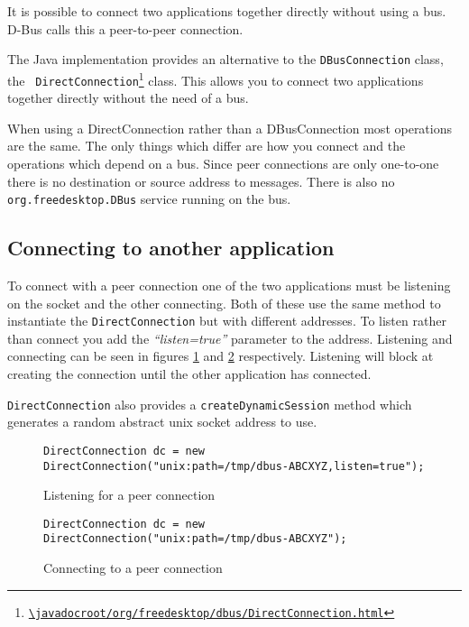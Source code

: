 \documentclass[a4paper,12pt]{article}
\begin{document}
It is possible to connect two applications together directly without using a
bus. D-Bus calls this a peer-to-peer connection.

The Java implementation provides an alternative to the {\tt DBusConnection}
class, the {\tt
DirectConnection\footnote{\url{\javadocroot/org/freedesktop/dbus/DirectConnection.html}}}
class. This allows you to connect two applications together directly without
the need of a bus.

When using a DirectConnection rather than a DBusConnection most operations are
the same. The only things which differ are how you connect and the operations
which depend on a bus. Since peer connections are only one-to-one there is no
destination or source address to messages. There is also no {\tt
org.freedesktop.DBus} service running on the bus.

\subsection{Connecting to another application}

To connect with a peer connection one of the two applications must be listening
on the socket and the other connecting. Both of these use the same method to
instantiate the {\tt DirectConnection} but with different addresses. To listen
rather than connect you add the {\em ``listen=true''} parameter to the address.
Listening and connecting can be seen in figures \ref{fig:p2plisten} and
\ref{fig:p2pconnect} respectively. Listening will block at creating the
connection until the other application has connected.

{\tt DirectConnection} also provides a {\tt createDynamicSession} method which
generates a random abstract unix socket address to use.

\begin{figure}[htb]
\begin{center}
\begin{verbatim}
DirectConnection dc = new DirectConnection("unix:path=/tmp/dbus-ABCXYZ,listen=true");
\end{verbatim}
\end{center}
\caption{Listening for a peer connection}
\label{fig:p2plisten}
\end{figure}

\begin{figure}[htb]
\begin{center}
\begin{verbatim}
DirectConnection dc = new DirectConnection("unix:path=/tmp/dbus-ABCXYZ");
\end{verbatim}
\end{center}
\caption{Connecting to a peer connection}
\label{fig:p2pconnect}
\end{figure}
\end{document}
